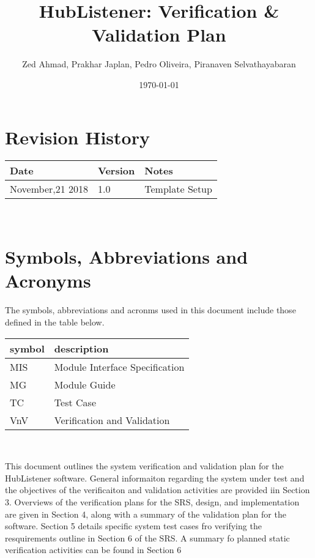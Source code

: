 \documentclass[12pt, titlepage]{article}
\begin{document}
\title{HubListener: Verification \& Validation Plan} 
\author{Zed Ahmad, Prakhar Japlan, Pedro Oliveira, Piranaven Selvathayabaran}
\date{\today}
	
\maketitle


\section{Revision History}

\begin{tabularx}{\textwidth}{p{3cm}p{2cm}X}
\toprule {\bf Date} & {\bf Version} & {\bf Notes}\\
\midrule
November,21 2018 & 1.0 & Template Setup\\
\bottomrule
\end{tabularx}

~\newpage

\section{Symbols, Abbreviations and Acronyms}

The symbols, abbreviations and acronms used in this document include those defined in the table below. \newline
\renewcommand{\arraystretch}{1.2}

\begin{tabular}{l l} 
  \toprule		
  \textbf{symbol} & \textbf{description}\\
  \midrule 
  MIS & Module Interface Specification\\
  MG & Module Guide \\
  TC & Test Case \\
  VnV & Verification and Validation\\
  \bottomrule
\end{tabular}\\


\newpage

\tableofcontents

\listoftables %

\listoffigures %

\newpage


This document outlines the system verification and validation plan for the HubListener software. General informaiton regarding the system under test and the objectives of the verificaiton and validation activities are provided iin Section 3.  Overviews of the verification plans for the SRS, design, and implementation are given in Section 4, along with a summary of the validation plan for the software. Section 5 details specific system test cases fro verifying the resquirements outline in Section 6 of the SRS. A summary fo planned static verification activities can be found in Section 6 
\end{document}

